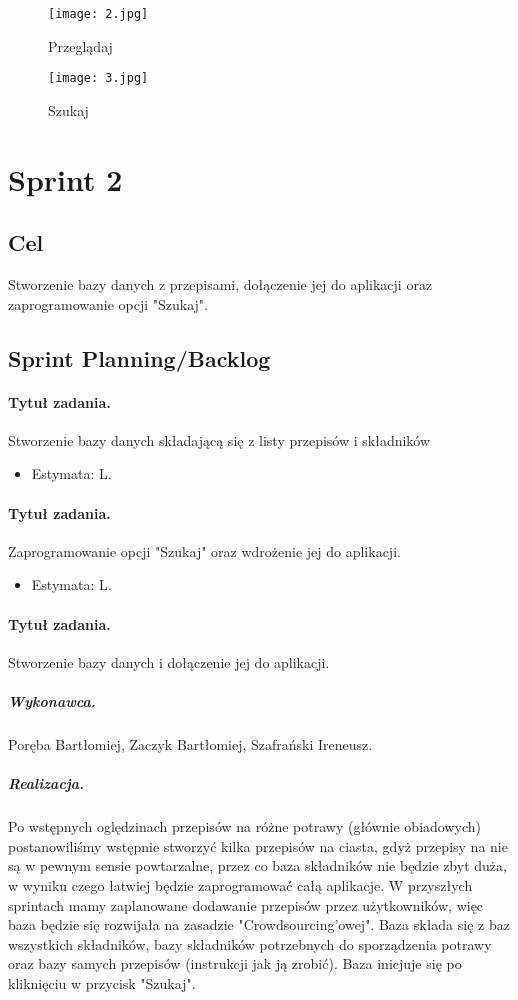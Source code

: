 \documentclass[a4paper]{article}
\begin{document}
	\begin{figure}
		\centering
		\texttt{[image: 2.jpg]}
		\caption{Przeglądaj}
		\label{przegladaj}
	\end{figure}
	
	\begin{figure}
		\centering
		\texttt{[image: 3.jpg]}
		\caption{Szukaj}
		\label{Szukaj}
	\end{figure}
	
	\section{Sprint 2}
	
	\subsection{Cel} Stworzenie bazy danych z przepisami, dołączenie jej do aplikacji oraz zaprogramowanie opcji "Szukaj".
	
	\subsection{Sprint Planning/Backlog}
	
	\paragraph{Tytuł zadania.} Stworzenie bazy danych składającą się z listy przepisów i składników
	\begin{itemize}
		\item Estymata: L.
	\end{itemize}
	
	\paragraph{Tytuł zadania.} Zaprogramowanie opcji "Szukaj" oraz wdrożenie jej do aplikacji.
	\begin{itemize}
		\item Estymata: L.
	\end{itemize}
	
	\paragraph{Tytuł zadania.} Stworzenie bazy danych i dołączenie jej do aplikacji.
	\subparagraph{Wykonawca.} Poręba Bartłomiej, Zaczyk Bartłomiej, Szafrański Ireneusz.
	\subparagraph{Realizacja.} 
	Po wstępnych oględzinach przepisów na różne potrawy (głównie obiadowych) postanowiliśmy wstępnie stworzyć kilka przepisów na ciasta, gdyż przepisy na nie są w pewnym sensie powtarzalne, przez co baza składników nie będzie zbyt duża, w wyniku czego łatwiej będzie zaprogramować całą aplikacje. W przyszłych sprintach mamy zaplanowane dodawanie przepisów przez użytkowników, więc baza będzie się rozwijała na zasadzie "Crowdsourcing'owej". Baza składa się z baz wszystkich składników, bazy składników potrzebnych do sporządzenia potrawy oraz bazy samych przepisów (instrukcji jak ją zrobić). Baza inicjuje się po kliknięciu w przycisk "Szukaj".
	
\end{document}
